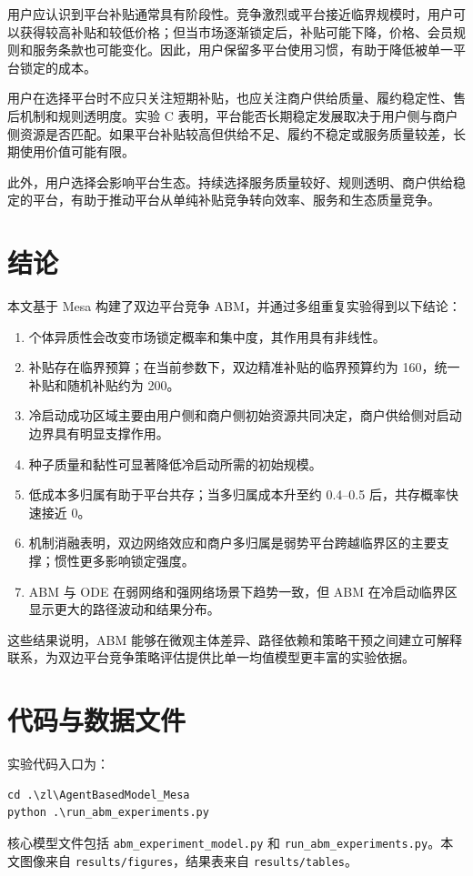 ﻿\documentclass[UTF8,zihao=-4]{ctexart}
\begin{document}
用户应认识到平台补贴通常具有阶段性。竞争激烈或平台接近临界规模时，用户可以获得较高补贴和较低价格；但当市场逐渐锁定后，补贴可能下降，价格、会员规则和服务条款也可能变化。因此，用户保留多平台使用习惯，有助于降低被单一平台锁定的成本。

用户在选择平台时不应只关注短期补贴，也应关注商户供给质量、履约稳定性、售后机制和规则透明度。实验 C 表明，平台能否长期稳定发展取决于用户侧与商户侧资源是否匹配。如果平台补贴较高但供给不足、履约不稳定或服务质量较差，长期使用价值可能有限。

此外，用户选择会影响平台生态。持续选择服务质量较好、规则透明、商户供给稳定的平台，有助于推动平台从单纯补贴竞争转向效率、服务和生态质量竞争。

\section{结论}

本文基于 Mesa 构建了双边平台竞争 ABM，并通过多组重复实验得到以下结论：

\begin{enumerate}
  \item 个体异质性会改变市场锁定概率和集中度，其作用具有非线性。
  \item 补贴存在临界预算；在当前参数下，双边精准补贴的临界预算约为 160，统一补贴和随机补贴约为 200。
  \item 冷启动成功区域主要由用户侧和商户侧初始资源共同决定，商户供给侧对启动边界具有明显支撑作用。
  \item 种子质量和黏性可显著降低冷启动所需的初始规模。
  \item 低成本多归属有助于平台共存；当多归属成本升至约 0.4--0.5 后，共存概率快速接近 0。
  \item 机制消融表明，双边网络效应和商户多归属是弱势平台跨越临界区的主要支撑；惯性更多影响锁定强度。
  \item ABM 与 ODE 在弱网络和强网络场景下趋势一致，但 ABM 在冷启动临界区显示更大的路径波动和结果分布。
\end{enumerate}

这些结果说明，ABM 能够在微观主体差异、路径依赖和策略干预之间建立可解释联系，为双边平台竞争策略评估提供比单一均值模型更丰富的实验依据。

\section*{代码与数据文件}

实验代码入口为：
\begin{verbatim}
cd .\zl\AgentBasedModel_Mesa
python .\run_abm_experiments.py
\end{verbatim}

核心模型文件包括 \texttt{abm\_experiment\_model.py} 和 \texttt{run\_abm\_experiments.py}。本文图像来自 \texttt{results/figures}，结果表来自 \texttt{results/tables}。
\end{document}
